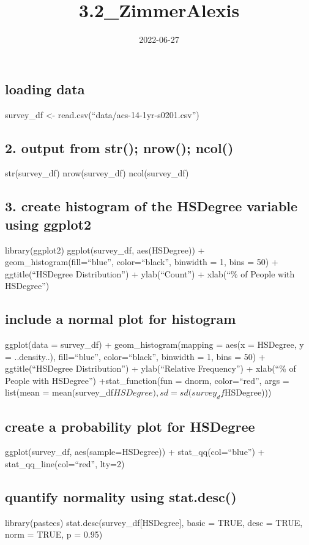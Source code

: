 \documentclass[
]{article}
\title{3.2\_ZimmerAlexis}
\author{}
\date{\vspace{-2.5em}2022-06-27}
\begin{document}
\maketitle

\hypertarget{loading-data}{%
\subsection{loading data}\label{loading-data}}

survey\_df \textless- read.csv(``data/acs-14-1yr-s0201.csv'')

\hypertarget{output-from-str-nrow-ncol}{%
\subsection{2. output from str(); nrow();
ncol()}\label{output-from-str-nrow-ncol}}

str(survey\_df) nrow(survey\_df) ncol(survey\_df)

\hypertarget{create-histogram-of-the-hsdegree-variable-using-ggplot2}{%
\subsection{3. create histogram of the HSDegree variable using
ggplot2}\label{create-histogram-of-the-hsdegree-variable-using-ggplot2}}

library(ggplot2) ggplot(survey\_df, aes(HSDegree)) +
geom\_histogram(fill=``blue'', color=``black'', binwidth = 1, bins = 50)
+ ggtitle(``HSDegree Distribution'') + ylab(``Count'') + xlab(``\% of
People with HSDegree'')

\hypertarget{include-a-normal-plot-for-histogram}{%
\subsection{include a normal plot for
histogram}\label{include-a-normal-plot-for-histogram}}

ggplot(data = survey\_df) + geom\_histogram(mapping = aes(x = HSDegree,
y = ..density..), fill=``blue'', color=``black'', binwidth = 1, bins =
50) + ggtitle(``HSDegree Distribution'') + ylab(``Relative Frequency'')
+ xlab(``\% of People with HSDegree'') +stat\_function(fun = dnorm,
color=``red'', args = list(mean =
mean(survey\_df\(HSDegree), sd = sd(survey_df\)HSDegree)))

\hypertarget{create-a-probability-plot-for-hsdegree}{%
\subsection{create a probability plot for
HSDegree}\label{create-a-probability-plot-for-hsdegree}}

ggplot(survey\_df, aes(sample=HSDegree)) + stat\_qq(col=``blue'') +
stat\_qq\_line(col=``red'', lty=2)

\hypertarget{quantify-normality-using-stat.desc}{%
\subsection{quantify normality using
stat.desc()}\label{quantify-normality-using-stat.desc}}

library(pastecs) stat.desc(survey\_df{[}HSDegree{]}, basic = TRUE, desc
= TRUE, norm = TRUE, p = 0.95)
\end{document}
